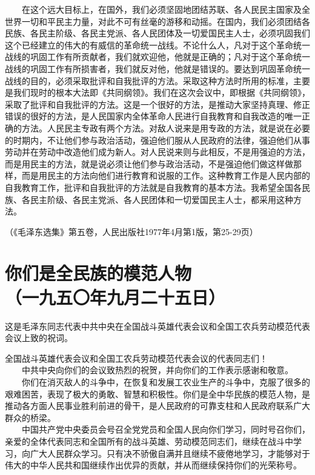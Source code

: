 \documentclass[cn,11pt,chinese]{elegantbook}
\def\myformat#1{\hfil\hfil #1}
\begin{document}
　　在这个远大目标上，在国外，我们必须坚固地团结苏联、各人民民主国家及全世界一切和平民主力量，对此不可有丝毫的游移和动摇。在国内，我们必须团结各民族、各民主阶级、各民主党派、各人民团体及一切爱国民主人士，必须巩固我们这个已经建立的伟大的有威信的革命统一战线。不论什么人，凡对于这个革命统一战线的巩固工作有所贡献者，我们就欢迎他，他就是正确的；凡对于这个革命统一战线的巩固工作有所损害者，我们就反对他，他就是错误的。要达到巩固革命统一战线的目的，必须采取批评和自我批评的方法。采取这种方法时所用的标准，主要是我们现时的根本大法即《共同纲领》。我们在这次会议中，即根据《共同纲领》，采取了批评和自我批评的方法。这是一个很好的方法，是推动大家坚持真理、修正错误的很好的方法，是人民国家内全体革命人民进行自我教育和自我改造的唯一正确的方法。人民民主专政有两个方法。对敌人说来是用专政的方法，就是说在必要的时期内，不让他们参与政治活动，强迫他们服从人民政府的法律，强迫他们从事劳动并在劳动中改造他们成为新人。对人民说来则与此相反，不是用强迫的方法，而是用民主的方法，就是说必须让他们参与政治活动，不是强迫他们做这样做那样，而是用民主的方法向他们进行教育和说服的工作。这种教育工作是人民内部的自我教育工作，批评和自我批评的方法就是自我教育的基本方法。我希望全国各民族、各民主阶级、各民主党派、各人民团体和一切爱国民主人士，都采用这种方法。\\
\begin{flushright}（《毛泽东选集》第五卷，人民出版社1977年4月第1版，第25-29页）\end{flushright}
\newpage\section*{\myformat{你们是全民族的模范人物}\\\myformat{（一九五〇年九月二十五日）}}
\begin{introduction}\item  这是毛泽东同志代表中共中央在全国战斗英雄代表会议和全国工农兵劳动模范代表会议上致的祝词。\end{introduction}
全国战斗英雄代表会议和全国工农兵劳动模范代表会议的代表同志们！\\
　　中共中央向你们的会议致热烈的祝贺，并向你们的工作表示感谢和敬意。\\
　　你们在消灭敌人的斗争中，在恢复和发展工农业生产的斗争中，克服了很多的艰难困苦，表现了极大的勇敢、智慧和积极性。你们是全中华民族的模范人物，是推动各方面人民事业胜利前进的骨干，是人民政府的可靠支柱和人民政府联系广大群众的桥梁。\\
　　中国共产党中央委员会号召全党党员和全国人民向你们学习，同时号召你们，亲爱的全体代表同志和全国所有的战斗英雄、劳动模范同志们，继续在战斗中学习，向广大人民群众学习。只有决不骄傲自满并且继续不疲倦地学习，才能够对于伟大的中华人民共和国继续作出优异的贡献，并从而继续保持你们的光荣称号。\\
\end{document}
